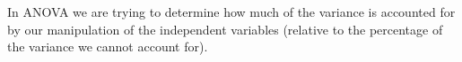 In ANOVA we are trying to determine how much of the variance is
accounted for by our manipulation of the independent variables (relative to the percentage of the variance we cannot account for).
\newpage